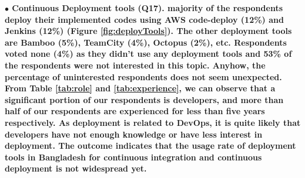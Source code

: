 \nd\bf{$\bullet$ Continuous Deployment tools (Q17).} majority of the respondents deploy their implemented codes using AWS code-deploy
(12\%) and Jenkins (12\%) (Figure \ref{fig:deployTools}). The other deployment tools are Bamboo (5\%), TeamCity
(4\%), Octopus (2\%), etc. Respondents voted none (4\%) as they didn't use any
deployment tools and 53\% of the respondents were not interested in this topic.
Anyhow, the percentage of uninterested respondents does not seem unexpected.
From Table \ref{tab:role} and \ref{tab:experience}, we can observe that a
significant portion of our respondents is developers, and more than half of our
respondents are experienced for less than five years respectively. As deployment
is related to DevOps, it is quite likely that developers have not enough
knowledge or have less interest in deployment. 
The outcome indicates that the usage rate of
deployment tools in Bangladesh for continuous integration and continuous
deployment is not widespread yet. 


